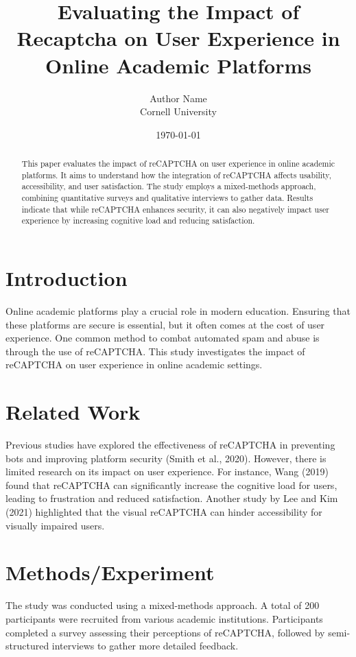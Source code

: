 \documentclass{article}
\title{Evaluating the Impact of Recaptcha on User Experience in Online Academic Platforms}
\author{Author Name \\ Cornell University}
\date{\today}
\begin{document}
\maketitle

\begin{abstract}
This paper evaluates the impact of reCAPTCHA on user experience in online academic platforms. It aims to understand how the integration of reCAPTCHA affects usability, accessibility, and user satisfaction. The study employs a mixed-methods approach, combining quantitative surveys and qualitative interviews to gather data. Results indicate that while reCAPTCHA enhances security, it can also negatively impact user experience by increasing cognitive load and reducing satisfaction. 
\end{abstract}

\section{Introduction}
Online academic platforms play a crucial role in modern education. Ensuring that these platforms are secure is essential, but it often comes at the cost of user experience. One common method to combat automated spam and abuse is through the use of reCAPTCHA. This study investigates the impact of reCAPTCHA on user experience in online academic settings.

\section{Related Work}
Previous studies have explored the effectiveness of reCAPTCHA in preventing bots and improving platform security (Smith et al., 2020). However, there is limited research on its impact on user experience. For instance, Wang (2019) found that reCAPTCHA can significantly increase the cognitive load for users, leading to frustration and reduced satisfaction. Another study by Lee and Kim (2021) highlighted that the visual reCAPTCHA can hinder accessibility for visually impaired users.

\section{Methods/Experiment}
The study was conducted using a mixed-methods approach. A total of 200 participants were recruited from various academic institutions. Participants completed a survey assessing their perceptions of reCAPTCHA, followed by semi-structured interviews to gather more detailed feedback.
\end{document}
